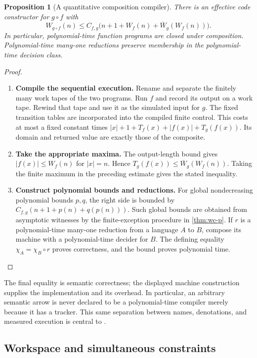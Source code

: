 \documentclass[11pt,a4paper]{article}
\numberwithin{algorithm}{section}
\numberwithin{equation}{section}
\newtheorem{proposition}[proposition]{Proposition}
\theoremstyle{definition}
\theoremstyle{remark}
\theoremstyle{plain}
\theoremstyle{definition}
\theoremstyle{plain}
\begin{document}
\begin{proposition}[A quantitative composition compiler]
\label{prop:wc-composition}
There is an effective code constructor for $g\circ f$ with
\[
 W_{g\circ f}(n)
 \le C_{f,g}\bigl(n+1+W_f(n)+\overline W_g(W_f(n))\bigr).
\]
In particular, polynomial-time function programs are closed under
composition. Polynomial-time many-one reductions preserve membership
in the polynomial-time decision class.
\end{proposition}
\begin{proof}\leavevmode
\begin{enumerate}[leftmargin=*,align=left]
\item \textbf{Compile the sequential execution.}
Rename and separate the finitely many work tapes of the two programs.
Run $f$ and record its output on a work tape. Rewind that tape and
use it as the simulated input for $g$. The fixed transition tables
are incorporated into the compiled finite control. This costs at
most a fixed constant times
$|x|+1+T_f(x)+|f(x)|+T_g(f(x))$.
Its domain and returned value are exactly those of the composite.
\item \textbf{Take the appropriate maxima.}
The output-length bound gives $|f(x)|\le W_f(n)$ for $|x|=n$.
Hence $T_g(f(x))\le\overline W_g(W_f(n))$. Taking the finite
maximum in the preceding estimate gives the stated inequality.
\item \textbf{Construct polynomial bounds and reductions.}
For global nondecreasing polynomial bounds $p,q$, the right side is
bounded by $C_{f,g}(n+1+p(n)+q(p(n)))$. Such global bounds are obtained
from asymptotic witnesses by the finite-exception procedure in
\cref{thm:wc-p}. If $r$ is a polynomial-time many-one reduction from
a language $A$ to $B$, compose its machine with a polynomial-time
decider for $B$. The defining equality
$\chi_A=\chi_B\circ r$ proves correctness, and the bound proves
polynomial time.
\end{enumerate}
\end{proof}

The final equality is semantic correctness; the displayed machine
construction supplies the implementation and its overhead. In
particular, an arbitrary semantic arrow is never declared to be a
polynomial-time compiler merely because it has a tracker. This same
separation between names, denotations, and measured execution is
central to \citet{KawamuraCook2012Operators}.


\subsection{Workspace and simultaneous constraints}
\end{document}
